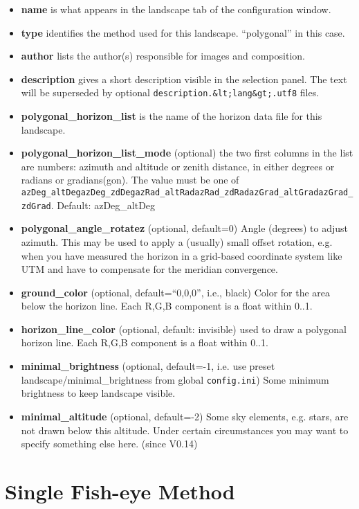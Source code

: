 \begin{itemize}
\item
  \textbf{name} is what appears in the landscape tab of the
  configuration window.
\item
  \textbf{type} identifies the method used for this landscape.
  ``polygonal'' in this case.
\item
  \textbf{author} lists the author(s) responsible for images and
  composition.
\item
  \textbf{description} gives a short description visible in the
  selection panel. The text will be superseded by optional
  \texttt{description.\&lt;lang\&gt;.utf8} files.
\item
  \textbf{polygonal\_horizon\_list} is the name of the horizon data file
  for this landscape.
\item
  \textbf{polygonal\_horizon\_list\_mode} (optional) the two first
  columns in the list are numbers: azimuth and altitude or zenith
  distance, in either degrees or radians or gradians(gon). The value
  must be one of
  \texttt{azDeg\_altDeg\textbar{}azDeg\_zdDeg\textbar{}azRad\_altRad\textbar{}azRad\_zdRad\textbar{}azGrad\_altGrad\textbar{}azGrad\_zdGrad}.
  Default: azDeg\_altDeg
\item
  \textbf{polygonal\_angle\_rotatez} (optional, default=0) Angle
  (degrees) to adjust azimuth. This may be used to apply a (usually)
  small offset rotation, e.g. when you have measured the horizon in a
  grid-based coordinate system like UTM and have to compensate for the
  meridian convergence.
\item
  \textbf{ground\_color} (optional, default=``0,0,0'', i.e., black)
  Color for the area below the horizon line. Each R,G,B component is a
  float within 0..1.
\item
  \textbf{horizon\_line\_color} (optional, default: invisible) used to
  draw a polygonal horizon line. Each R,G,B component is a float within
  0..1.
\item
  \textbf{minimal\_brightness} (optional, default=-1, i.e. use preset
  landscape/minimal\_brightness from global \texttt{config.ini}) Some
  minimum brightness to keep landscape visible.
\item
  \textbf{minimal\_altitude} (optional, default=-2) Some sky elements,
  e.g. stars, are not drawn below this altitude. Under certain
  circumstances you may want to specify something else here. (since
  V0.14)
\end{itemize}

\section{Single Fish-eye Method}\label{single-fish-eye-method}

